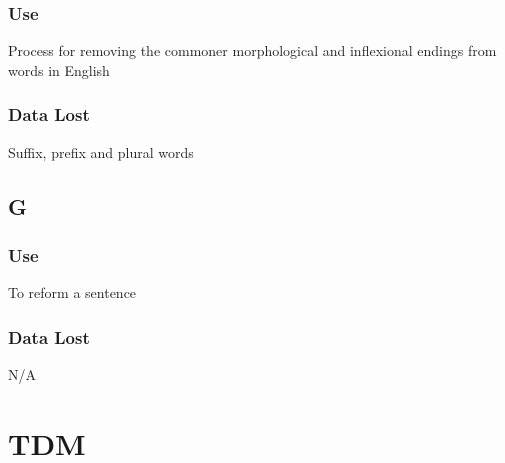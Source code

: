 \documentclass{article}
\begin{document}
\subsubsection{Use}

Process for removing the commoner morphological and inflexional endings from words in English

\subsubsection{Data Lost}

Suffix, prefix and plural words 

\subsection{G}

\subsubsection{Use}

To reform a sentence

\subsubsection{Data Lost}

N/A

\section{TDM}

\end{document}
